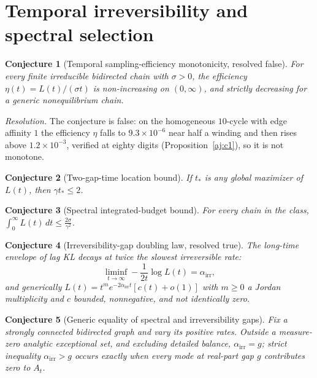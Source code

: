 \documentclass[11pt]{article}
\newtheorem{conjecture}{Conjecture}
\theoremstyle{definition}
\begin{document}
\section{Temporal irreversibility and spectral selection}

\begin{conjecture}[Temporal sampling-efficiency monotonicity, resolved false]\label{aj1}
For every finite irreducible bidirected chain with $\sigma>0$, the efficiency $\eta(t)=L(t)/(\sigma t)$ is non-increasing on $(0,\infty)$, and strictly decreasing for a generic nonequilibrium chain.
\end{conjecture}

\emph{Resolution.} The conjecture is false: on the homogeneous $10$-cycle with edge affinity $1$ the efficiency $\eta$ falls to $9.3\times10^{-6}$ near half a winding and then rises above $1.2\times10^{-3}$, verified at eighty digits (Proposition~\ref{aj:c1}), so it is not monotone.

\begin{conjecture}[Two-gap-time location bound]\label{aj2}
If $t_*$ is any global maximizer of $L(t)$, then $\gamma t_*\le2$.
\end{conjecture}

\begin{conjecture}[Spectral integrated-budget bound]\label{aj3}
For every chain in the class, $\displaystyle\int_0^\infty L(t)\,dt\le\frac{2\sigma}{\gamma^2}$.
\end{conjecture}

\begin{conjecture}[Irreversibility-gap doubling law, resolved true]\label{aj4}
The long-time envelope of lag KL decays at twice the slowest irreversible rate:
\[
\liminf_{t\to\infty}-\frac1{2t}\log L(t)=\alpha_{\mathrm{irr}},
\]
and generically $L(t)=t^{m}e^{-2\alpha_{\mathrm{irr}}t}[c(t)+o(1)]$ with $m\ge0$ a Jordan multiplicity and $c$ bounded, nonnegative, and not identically zero.
\end{conjecture}

\begin{conjecture}[Generic equality of spectral and irreversibility gaps]\label{aj5}
Fix a strongly connected bidirected graph and vary its positive rates.  Outside a measure-zero analytic exceptional set, and excluding detailed balance, $\alpha_{\mathrm{irr}}=g$; strict inequality $\alpha_{\mathrm{irr}}>g$ occurs exactly when every mode at real-part gap $g$ contributes zero to $A_t$.
\end{conjecture}
\end{document}
